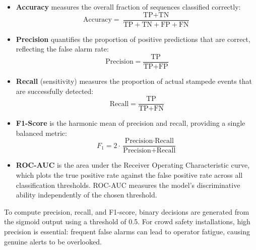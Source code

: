\begin{itemize}
  \item \textbf{Accuracy} measures the overall fraction of sequences classified correctly:
  \begin{equation}
    \text{Accuracy} = \frac{\text{TP} + \text{TN}}{\text{TP} + \text{TN} + \text{FP} + \text{FN}}
  \end{equation}

  \item \textbf{Precision} quantifies the proportion of positive predictions that are correct, reflecting the false alarm rate:
  \begin{equation}
    \text{Precision} = \frac{\text{TP}}{\text{TP} + \text{FP}}
  \end{equation}

  \item \textbf{Recall} (sensitivity) measures the proportion of actual stampede events that are successfully detected:
  \begin{equation}
    \text{Recall} = \frac{\text{TP}}{\text{TP} + \text{FN}}
  \end{equation}

  \item \textbf{F1-Score} is the harmonic mean of precision and recall, providing a single balanced metric:
  \begin{equation}
    F_1 = 2 \cdot \frac{\text{Precision} \cdot \text{Recall}}{\text{Precision} + \text{Recall}}
  \end{equation}

  \item \textbf{ROC-AUC} is the area under the Receiver Operating Characteristic curve, which plots the true positive rate against the false positive rate across all classification thresholds. ROC-AUC measures the model's discriminative ability independently of the chosen threshold.
\end{itemize}

To compute precision, recall, and F1-score, binary decisions are generated from the sigmoid output using a threshold of 0.5. For crowd safety installations, high precision is essential: frequent false alarms can lead to operator fatigue, causing genuine alerts to be overlooked.
